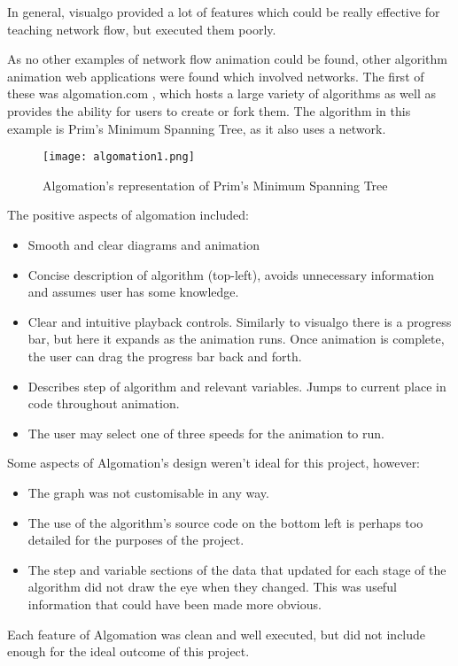 \documentclass{l4proj}
\begin{document}
In general, visualgo provided a lot of features which could be really effective for teaching network flow, but executed them poorly.

As no other examples of network flow animation could be found, other algorithm animation web applications were found which involved networks. The first of these was algomation.com \cite{algomation}, which hosts a large variety of algorithms as well as provides the ability for users to create or fork them. The algorithm in this example is Prim's Minimum Spanning Tree, as it also uses a network.

\begin{figure}[h]
    \centering
    \texttt{[image: algomation1.png]}
    \caption{Algomation's representation of Prim's Minimum Spanning Tree}
    \label{fig:my_label}
\end{figure}

The positive aspects of algomation included:
\begin{itemize}[noitemsep]
    \item Smooth and clear diagrams and animation
    \item Concise description of algorithm (top-left), avoids unnecessary information and assumes user has some knowledge.
    \item Clear and intuitive playback controls. Similarly to visualgo there is a progress bar, but here it expands as the animation runs. Once animation is complete, the user can drag the progress bar back and forth.
    \item Describes step of algorithm and relevant variables. Jumps to current place in code throughout animation.
    \item The user may select one of three speeds for the animation to run.
\end{itemize}

Some aspects of Algomation's design weren't ideal for this project, however:
\begin{itemize}[noitemsep]
    \item The graph was not customisable in any way.
    \item The use of the algorithm's source code on the bottom left is perhaps too detailed for the purposes of the project.
    \item The step and variable sections of the data that updated for each stage of the algorithm did not draw the eye when they changed. This was useful information that could have been made more obvious.
\end{itemize}
Each feature of Algomation was clean and well executed, but did not include enough for the ideal outcome of this project.
\end{document}
